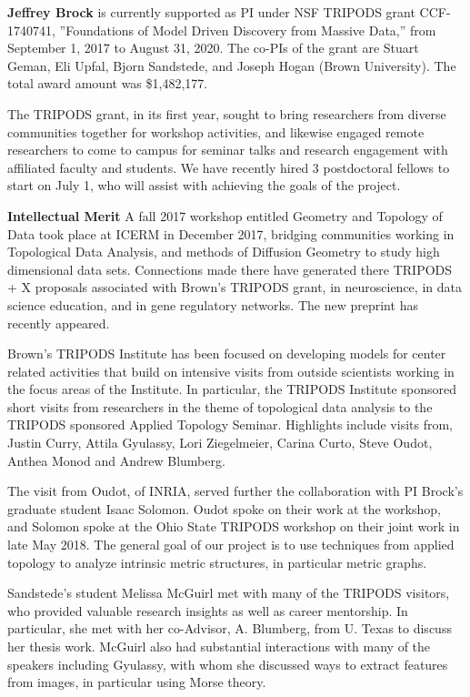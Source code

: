 

\textbf{Jeffrey Brock} is currently supported as PI under NSF TRIPODS grant CCF-1740741, ''Foundations of Model Driven Discovery from Massive Data,'' from September 1, 2017 to August 31, 2020. The co-PIs of the grant are Stuart Geman, Eli Upfal, Bjorn Sandstede, and Joseph Hogan (Brown University). The total award amount was \$1,482,177.

The TRIPODS grant, in its first year, sought to bring researchers from diverse communities together for workshop activities, and likewise engaged remote researchers to come to campus for seminar talks and research engagement with affiliated faculty and students. We have recently hired 3 postdoctoral fellows to start on July 1, who will assist with achieving the goals of the project.

\textbf{Intellectual Merit} A fall 2017 workshop entitled Geometry and Topology of Data took place at ICERM in December 2017, bridging communities working in Topological Data Analysis, and methods of Diffusion Geometry to study high dimensional data sets. Connections made there have generated there TRIPODS + X proposals associated with Brown's TRIPODS grant, in neuroscience, in data science education, and in gene regulatory networks. The new preprint \citep{Oudot:Solomon:persistence} has recently appeared.

Brown's TRIPODS Institute has been focused on developing models for center related activities that build on intensive visits from outside scientists working in the focus areas of the Institute. In particular, the TRIPODS Institute sponsored short visits from researchers in the theme of topological data analysis to the TRIPODS sponsored Applied Topology Seminar. Highlights include visits from, Justin Curry, Attila Gyulassy, Lori Ziegelmeier, Carina Curto, Steve Oudot, Anthea Monod and Andrew Blumberg.

The visit from Oudot, of INRIA, served further the collaboration with PI Brock's graduate student Isaac Solomon. Oudot spoke on their work at the workshop, and Solomon spoke at the Ohio State TRIPODS workshop on their joint work in late May 2018. The general goal of our project is to use techniques from applied topology to analyze intrinsic metric structures, in particular metric graphs.

Sandstede's student Melissa McGuirl met with many of the TRIPODS visitors, who provided valuable research insights as well as career mentorship. In particular, she met with her co-Advisor, A. Blumberg, from U. Texas to discuss her thesis work. McGuirl also had substantial interactions with many of the speakers including Gyulassy, with whom she discussed ways to extract features from images, in particular using Morse theory. 

